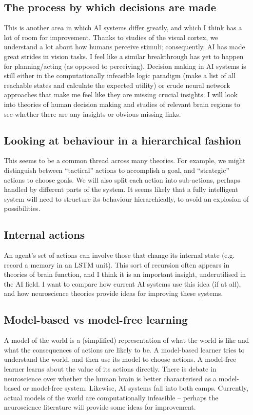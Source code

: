 \documentclass[10pt,a4paper]{article}
\newcommand{\nquote}[1]{``{#1}''}
\begin{document}
\subsection{The process by which decisions are made}
This is another area in which AI systems differ greatly, and which I think has a lot of room for improvement. Thanks to studies of the visual cortex, we understand a lot about how humans perceive stimuli; consequently, AI has made great strides in vision tasks. I feel like a similar breakthrough has yet to happen for planning/acting (as opposed to perceiving). Decision making in AI systems is still either in the computationally infeasible logic paradigm (make a list of all reachable states and calculate the expected utility) or crude neural network approaches that make me feel like they are missing crucial insights. I will look into theories of human decision making and studies of relevant brain regions to see whether there are any insights or obvious missing links.

\subsection{Looking at behaviour in a hierarchical fashion}
This seems to be a common thread across many theories. For example, we might distinguish between \nquote{tactical} actions to accomplish a goal, and \nquote{strategic} actions to choose goals. We will also split each action into sub-actions, perhaps handled by different parts of the system. It seems likely that a fully intelligent system will need to structure its behaviour hierarchically, to avoid an explosion of possibilities.

\subsection{Internal actions}
An agent's set of actions can involve those that change its internal state (e.g. record a memory in an LSTM unit). This sort of recursion often appears in theories of brain function, and I think it is an important insight, underutilised in the AI field. I want to compare how current AI systems use this idea (if at all), and how neuroscience theories provide ideas for improving these systems.

\subsection{Model-based vs model-free learning}
A model of the world is a (simplified) representation of what the world is like and what the consequences of actions are likely to be. A model-based learner tries to understand the world, and then use its model to choose actions. A model-free learner learns about the value of its actions directly. There is debate in neuroscience over whether the human brain is better characterised as a model-based or model-free system. Likewise, AI systems fall into both camps. Currently, actual models of the world are computationally infeasible -- perhaps the neuroscience literature will provide some ideas for improvement.
\end{document}
